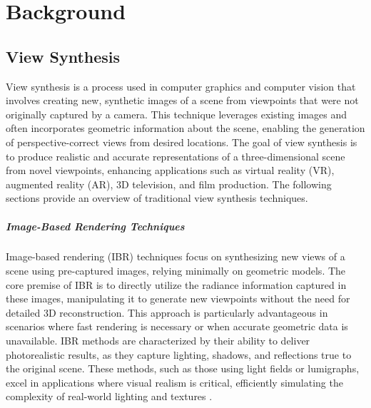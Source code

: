 %
\chapter{Background}
\label{sec:background}

\section{View Synthesis}

View synthesis is a process used in computer graphics and computer vision that involves creating new, synthetic images of a scene from viewpoints that were not originally captured by a camera.
This technique leverages existing images and often incorporates geometric information about the scene, enabling the generation of perspective-correct views from desired locations.
The goal of view synthesis is to produce realistic and accurate representations of a three-dimensional scene from novel viewpoints, enhancing applications such as virtual reality (VR), augmented reality (AR), 3D television, and film production.
The following sections provide an overview of traditional view synthesis techniques.

\paragraph{Image-Based Rendering Techniques}
Image-based rendering (IBR) techniques focus on synthesizing new views of a scene using pre-captured images, relying minimally on geometric models.
The core premise of IBR is to directly utilize the radiance information captured in these images, manipulating it to generate new viewpoints without the need for detailed 3D reconstruction.
This approach is particularly advantageous in scenarios where fast rendering is necessary or when accurate geometric data is unavailable.
IBR methods are characterized by their ability to deliver photorealistic results, as they capture lighting, shadows, and reflections true to the original scene.
These methods, such as those using light fields or lumigraphs, excel in applications where visual realism is critical, efficiently simulating the complexity of real-world lighting and textures \cite{buehler_unstructured_2001,chen_view_1993,debevec_modeling_1996,gortler_lumigraph_1996,levoy_light_1996}.

